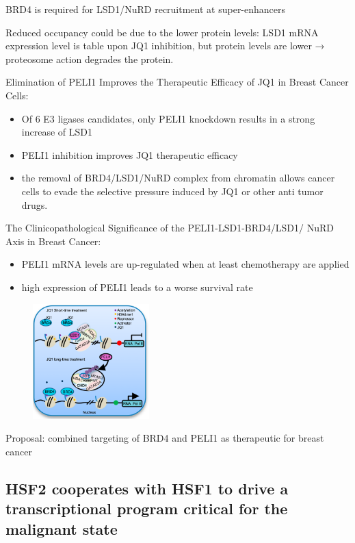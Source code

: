 BRD4 is required for LSD1/NuRD recruitment at super-enhancers

Reduced occupancy could be due to the lower protein levels: LSD1 mRNA
expression level is table upon JQ1 inhibition, but protein levels are
lower → proteosome action degrades the protein.

Elimination of PELI1 Improves the Therapeutic Efficacy of JQ1 in Breast Cancer Cells:
\begin{itemize}
\tightlist
\item
  Of 6 E3 ligases candidates, only PELI1 knockdown results in a strong
  increase of LSD1
\item
  PELI1 inhibition improves JQ1 therapeutic efficacy
\item
  the removal of BRD4/LSD1/NuRD complex from chromatin allows cancer
  cells to evade the selective pressure induced by JQ1 or other anti
  tumor drugs.
\end{itemize}

The Clinicopathological Significance of the
PELI1-LSD1-BRD4/LSD1/ NuRD Axis in Breast
Cancer:

\begin{itemize}
\tightlist
\item
  PELI1 mRNA levels are up-regulated when at least chemotherapy are
  applied
\item
  high expression of PELI1 leads to a worse survival rate
\end{itemize}

\begin{figure}
\centering
\includegraphics[width=0.4\textwidth]{../_resources/Screenshot_2022-10-28_at_11-55-04.png}
\caption{}
\end{figure}

Proposal: combined targeting of BRD4 and PELI1 as therapeutic for breast
cancer

\subsection{HSF2 cooperates with HSF1 to drive a transcriptional program critical for the malignant state}

